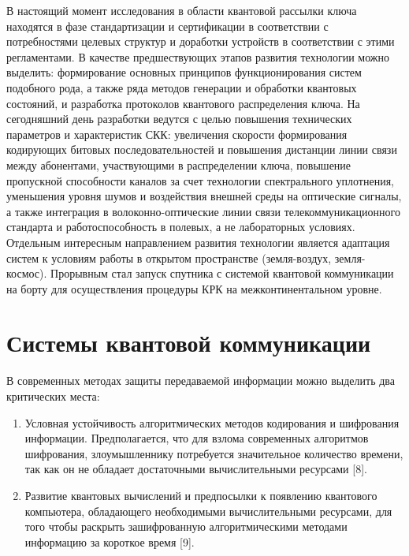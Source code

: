 В настоящий момент исследования в области квантовой рассылки ключа находятся в фазе стандартизации и сертификации в соответствии с потребностями целевых структур и доработки устройств в соответствии с этими регламентами. В качестве предшествующих этапов развития технологии можно выделить: формирование основных принципов функционирования систем подобного рода, а также ряда методов генерации и обработки квантовых состояний, и разработка протоколов квантового распределения ключа. На сегодняшний день разработки ведутся с целью повышения технических параметров и характеристик СКК: увеличения скорости формирования кодирующих битовых последовательностей и повышения дистанции линии связи между абонентами, участвующими в распределении ключа, повышение пропускной способности каналов за счет технологии спектрального уплотнения, уменьшения уровня шумов и воздействия внешней среды на оптические сигналы, а также интеграция в волоконно-оптические линии связи телекоммуникационного стандарта и работоспособность в полевых, а не лабораторных условиях. Отдельным интересным направлением развития технологии является адаптация систем к условиям работы в открытом пространстве (земля-воздух, земля-космос). Прорывным стал запуск спутника с системой квантовой коммуникации на борту для осуществления процедуры КРК на межконтинентальном уровне.


\section{Системы квантовой коммуникации} \label{sec:ch1/sec2}

В современных методах защиты передаваемой информации можно выделить два критических места:
\begin{enumerate}
	\item Условная устойчивость алгоритмических методов кодирования и шифрования информации. Предполагается, что для взлома современных алгоритмов шифрования, злоумышленнику потребуется значительное количество времени, так как он не обладает достаточными вычислительными ресурсами [8].
	\item Развитие квантовых вычислений и предпосылки к появлению квантового компьютера, обладающего необходимыми вычислительными ресурсами, для того чтобы раскрыть зашифрованную алгоритмическими методами информацию за короткое время [9].
\end{enumerate} 


